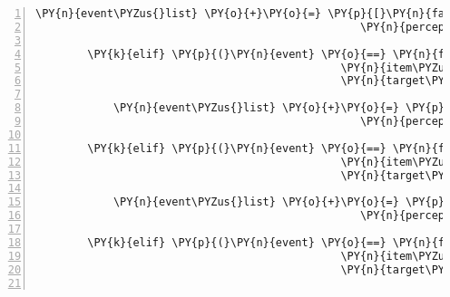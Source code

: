 \begin{Verbatim}[commandchars=\\\{\},numbers=left,firstnumber=1,stepnumber=1]
            \PY{n}{event\PYZus{}list} \PY{o}{+}\PY{o}{=} \PY{p}{[}\PY{n}{fabula}\PY{o}{.}\PY{n}{PerceptionEvent}\PY{p}{(}\PY{n}{identifier}\PY{o}{=}\PY{n}{ID\PYZus{}CASSANDRA}\PY{p}{,}
                                                  \PY{n}{perception}\PY{o}{=}\PY{l+s}{\PYZsq{}}\PY{l+s}{Ich traue mich nicht, der Spinne den Schlüssel zurück zu geben.}\PY{l+s}{\PYZsq{}}\PY{p}{)}\PY{p}{]}

        \PY{k}{elif} \PY{p}{(}\PY{n}{event} \PY{o}{==} \PY{n}{fabula}\PY{o}{.}\PY{n}{TriesToDropEvent}\PY{p}{(}\PY{n}{identifier}\PY{o}{=}\PY{n}{ID\PYZus{}CASSANDRA}\PY{p}{,}
                                               \PY{n}{item\PYZus{}identifier}\PY{o}{=}\PY{l+s}{\PYZsq{}}\PY{l+s}{key}\PY{l+s}{\PYZsq{}}\PY{p}{,}
                                               \PY{n}{target\PYZus{}identifier}\PY{o}{=}\PY{l+s}{\PYZsq{}}\PY{l+s}{sign}\PY{l+s}{\PYZsq{}}\PY{p}{)}\PY{p}{)}\PY{p}{:}

            \PY{n}{event\PYZus{}list} \PY{o}{+}\PY{o}{=} \PY{p}{[}\PY{n}{fabula}\PY{o}{.}\PY{n}{PerceptionEvent}\PY{p}{(}\PY{n}{identifier}\PY{o}{=}\PY{n}{ID\PYZus{}CASSANDRA}\PY{p}{,}
                                                  \PY{n}{perception}\PY{o}{=}\PY{l+s}{\PYZsq{}}\PY{l+s}{Ein Schild hat kein Schloss.}\PY{l+s}{\PYZsq{}}\PY{p}{)}\PY{p}{]}

        \PY{k}{elif} \PY{p}{(}\PY{n}{event} \PY{o}{==} \PY{n}{fabula}\PY{o}{.}\PY{n}{TriesToDropEvent}\PY{p}{(}\PY{n}{identifier}\PY{o}{=}\PY{n}{ID\PYZus{}CASSANDRA}\PY{p}{,}
                                               \PY{n}{item\PYZus{}identifier}\PY{o}{=}\PY{l+s}{\PYZsq{}}\PY{l+s}{key}\PY{l+s}{\PYZsq{}}\PY{p}{,}
                                               \PY{n}{target\PYZus{}identifier}\PY{o}{=}\PY{l+s}{\PYZsq{}}\PY{l+s}{cobweb}\PY{l+s}{\PYZsq{}}\PY{p}{)}\PY{p}{)}\PY{p}{:}

            \PY{n}{event\PYZus{}list} \PY{o}{+}\PY{o}{=} \PY{p}{[}\PY{n}{fabula}\PY{o}{.}\PY{n}{PerceptionEvent}\PY{p}{(}\PY{n}{identifier}\PY{o}{=}\PY{n}{ID\PYZus{}CASSANDRA}\PY{p}{,}
                                                  \PY{n}{perception}\PY{o}{=}\PY{l+s}{\PYZsq{}}\PY{l+s}{Das lass ich lieber.}\PY{l+s}{\PYZsq{}}\PY{p}{)}\PY{p}{]}

        \PY{k}{elif} \PY{p}{(}\PY{n}{event} \PY{o}{==} \PY{n}{fabula}\PY{o}{.}\PY{n}{TriesToDropEvent}\PY{p}{(}\PY{n}{identifier}\PY{o}{=}\PY{n}{ID\PYZus{}CASSANDRA}\PY{p}{,}
                                               \PY{n}{item\PYZus{}identifier}\PY{o}{=}\PY{l+s}{\PYZsq{}}\PY{l+s}{key}\PY{l+s}{\PYZsq{}}\PY{p}{,}
                                               \PY{n}{target\PYZus{}identifier}\PY{o}{=}\PY{l+s}{\PYZsq{}}\PY{l+s}{bridge}\PY{l+s}{\PYZsq{}}\PY{p}{)}\PY{p}{)}\PY{p}{:}


\end{Verbatim}
